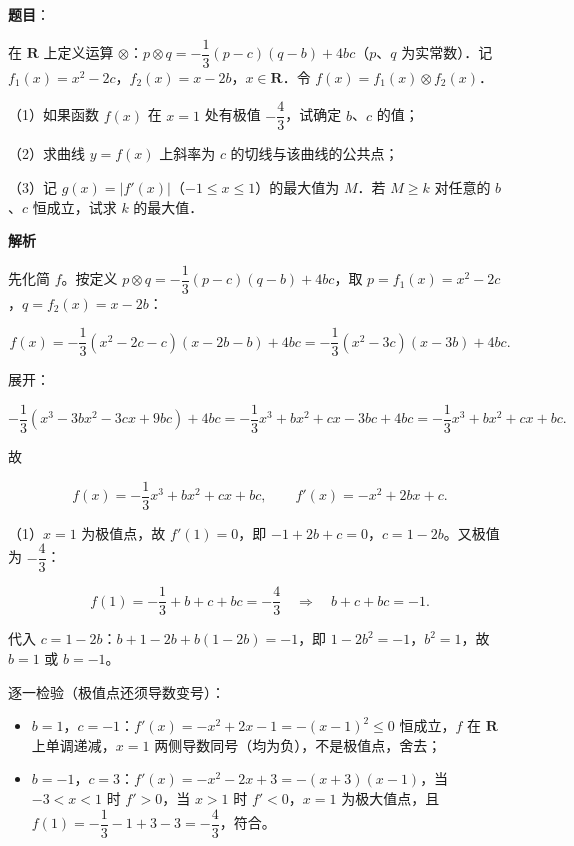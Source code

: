 \begin{answer}

\textbf{题目}：

在 $\mathbf R$ 上定义运算 $\otimes$：$p\otimes q=-\dfrac13(p-c)(q-b)+4bc$（$p$、$q$ 为实常数）．记 $f_1(x)=x^2-2c$，$f_2(x)=x-2b$，$x\in\mathbf R$．令 $f(x)=f_1(x)\otimes f_2(x)$．

（1）如果函数 $f(x)$ 在 $x=1$ 处有极值 $-\dfrac43$，试确定 $b$、$c$ 的值；

（2）求曲线 $y=f(x)$ 上斜率为 $c$ 的切线与该曲线的公共点；

（3）记 $g(x)=|f'(x)|$（$-1\leqslant x\leqslant 1$）的最大值为 $M$．若 $M\geqslant k$ 对任意的 $b$、$c$ 恒成立，试求 $k$ 的最大值．

\textbf{解析}

先化简 $f$。按定义 $p\otimes q=-\dfrac13(p-c)(q-b)+4bc$，取 $p=f_1(x)=x^2-2c$，$q=f_2(x)=x-2b$：

\nopagebreak[4]
\[f(x)=-\frac13\left(x^2-2c-c\right)\left(x-2b-b\right)+4bc
=-\frac13\left(x^2-3c\right)(x-3b)+4bc.\]

展开：

\nopagebreak[4]
\[-\frac13\left(x^3-3bx^2-3cx+9bc\right)+4bc=-\frac13x^3+bx^2+cx-3bc+4bc=-\frac13x^3+bx^2+cx+bc.\]

故

\nopagebreak[4]
\[f(x)=-\frac13x^3+bx^2+cx+bc,\qquad f'(x)=-x^2+2bx+c.\]

（1）$x=1$ 为极值点，故 $f'(1)=0$，即 $-1+2b+c=0$，$c=1-2b$。又极值为 $-\dfrac43$：

\nopagebreak[4]
\[f(1)=-\frac13+b+c+bc=-\frac43\quad\Longrightarrow\quad b+c+bc=-1.\]

代入 $c=1-2b$：$b+1-2b+b(1-2b)=-1$，即 $1-2b^2=-1$，$b^2=1$，故 $b=1$ 或 $b=-1$。

逐一检验（极值点还须导数变号）：

\begin{itemize}
\item $b=1$，$c=-1$：$f'(x)=-x^2+2x-1=-(x-1)^2\leqslant0$ 恒成立，$f$ 在 $\mathbf R$ 上单调递减，$x=1$ 两侧导数同号（均为负），不是极值点，舍去；
\item $b=-1$，$c=3$：$f'(x)=-x^2-2x+3=-(x+3)(x-1)$，当 $-3<x<1$ 时 $f'>0$，当 $x>1$ 时 $f'<0$，$x=1$ 为极大值点，且 $f(1)=-\dfrac13-1+3-3=-\dfrac43$，符合。
\end{itemize}


\end{answer}
